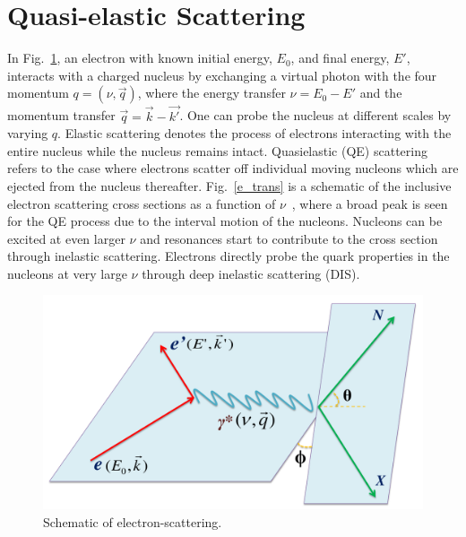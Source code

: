 \section{Quasi-elastic Scattering}
 In Fig.~\ref{e_scatt}, an electron with known initial energy, $E_{0}$, and final energy, $E'$, interacts with a charged nucleus by exchanging a virtual photon with the four momentum $q=(\nu,\vec{q})$, where the energy transfer $\nu = E_{0}-E'$ and the momentum transfer $\vec{q}=\vec{k}-\vec{k'}$. One can probe the nucleus at different scales by varying $q$. Elastic scattering denotes the process of electrons interacting with the entire nucleus while the nucleus remains intact. Quasielastic (QE) scattering refers to the case where electrons scatter off individual moving nucleons which are ejected from the nucleus thereafter. Fig.~\ref{e_trans} is a schematic of the inclusive electron scattering cross sections as a function of $\nu$~\cite{qe_donal}, where a broad peak is seen for the QE process due to the interval motion of the nucleons. Nucleons can be excited at even larger $\nu$ and resonances start to contribute to the cross section through inelastic scattering. Electrons directly probe the quark properties in the nucleons at very large $\nu$ through deep inelastic scattering (DIS). 
\begin{figure}[!ht]
  \begin{center}         
    \includegraphics[type=pdf,ext=.pdf,read=.pdf,width=0.60\linewidth]{./figures/physics/e_scatt}
    \caption[Schematic of electron-scattering]{\footnotesize{Schematic of electron-scattering.}}
    \label{e_scatt}
  \end{center}
\end{figure}
